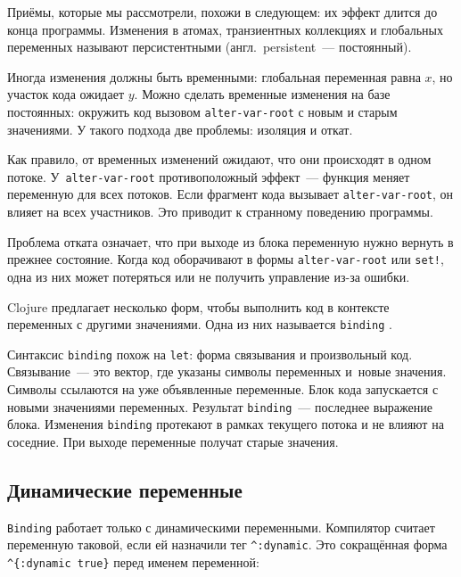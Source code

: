 
Приёмы, которые мы рассмотрели, похожи в следующем: их эффект длится до конца
программы. Изменения в атомах, транзиентных коллекциях и глобальных переменных
называют персистентными (англ.~persistent~--- постоянный).

Иногда изменения должны быть временными: глобальная переменная равна $x$, но
участок кода ожидает $y$. Можно сделать временные изменения на базе постоянных:
окружить код вызовом \verb|alter-var-root| с новым и старым значениями. У
такого подхода две проблемы: изоляция и откат.


Как правило, от временных изменений ожидают, что они происходят в одном
потоке. У~\verb|alter-var-root| противоположный эффект~--- функция меняет
переменную для всех потоков. Если фрагмент кода вызывает \verb|alter-var-root|,
он влияет на всех участников. Это приводит к странному поведению программы.

Проблема отката означает, что при выходе из блока переменную нужно вернуть в прежнее
состояние. Когда код оборачивают в формы \verb|alter-var-root| или \verb|set!|, одна
из них может потеряться или не получить управление из-за ошибки.

Clojure предлагает несколько форм, чтобы выполнить код в контексте переменных с
другими значениями. Одна из них называется \verb|binding| .


Синтаксис \verb|binding| похож на \verb|let|: форма связывания и произвольный
код. Связывание~--- это вектор, где указаны символы переменных и~новые
значения. Символы ссылаются на уже объявленные переменные. Блок кода запускается
с новыми значениями переменных. Результат \verb|binding|~--- последнее выражение
блока. Изменения \verb|binding| протекают в рамках текущего потока и не влияют
на соседние. При выходе переменные получат старые значения.

\subsection{Динамические переменные}

\label{dynamic-vars}


\verb|Binding| работает только с динамическими переменными. Компилятор считает
переменную таковой, если ей назначили тег \verb|^:dynamic|. Это сокращённая
форма \verb|^{:dynamic true}| перед именем переменной:

